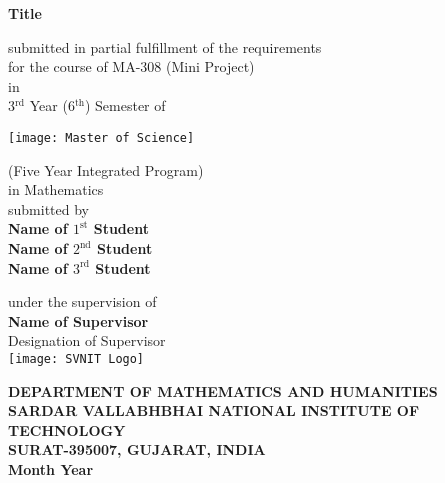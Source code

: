 \documentclass[11pt,a4paper]{report}
\begin{document}
\begin{titlepage}
\begin{center}
\begin{LARGE}
{\color{red} \textbf{Title}}  \\[2\baselineskip]
\end{LARGE}

\begin{large}
submitted in partial fulfillment of the requirements \\
for the course of MA-308 (Mini Project) \\ 
in \\
3$^{\text{rd}}$ Year (6$^{\text{th}}$) Semester of \\[1\baselineskip]
\end{large}

\begin{center}
\texttt{[image: Master of Science]}
\end{center}


(Five Year Integrated Program) \\
in Mathematics \\

submitted by  \\[1\baselineskip]

{\color{red} \textbf{Name of $1^{\text{st}}$ Student \\
Name of $2^{\text{nd}}$ Student \\
Name of $3^{\text{rd}}$ Student}}


\vspace{1\baselineskip}

under the supervision of \\
{\color{red} \textbf{Name of Supervisor} \\
Designation of Supervisor} \\[2\baselineskip]

\texttt{[image: SVNIT Logo]} \\[2\baselineskip]

\begin{large}
\textbf{DEPARTMENT OF MATHEMATICS AND HUMANITIES \\
SARDAR VALLABHBHAI NATIONAL INSTITUTE OF TECHNOLOGY \\
SURAT-395007, GUJARAT, INDIA \\[1\baselineskip]
{\color{red} Month Year}}
\end{large}
\end{center}
\end{titlepage}
\end{document}
